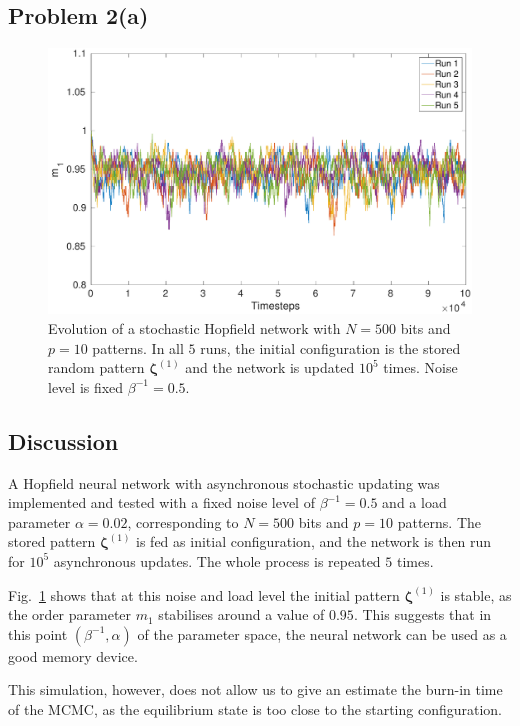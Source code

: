 \documentclass[12pt,A4,titlepage]{article}
\begin{document}
\subsection*{Problem 2(a)}

\begin{figure}[H]
\centering
\includegraphics[width=\textwidth]{figures/fig_2a.pdf}
\caption{Evolution of a stochastic Hopfield network with $N = 500$ bits and $p = 10$ patterns. In all $5$ runs, the initial configuration is the  stored random pattern $\bm{\zeta}^{(1)}$ and the network is updated $10^5$ times. Noise level is fixed $\beta^{-1} = 0.5$.}
\label{2a}
\end{figure}

\subsection*{Discussion}
A Hopfield neural network with asynchronous stochastic updating was implemented and tested with a fixed noise level of $\beta^{-1} = 0.5$ and a load parameter $\alpha = 0.02$, corresponding to $N = 500$ bits and $p = 10$ patterns. 
The stored pattern $\bm{\zeta}^{(1)}$ is fed as initial configuration, and the network is then run for $10^5$ asynchronous updates. The whole process is repeated $5$ times. 

Fig.~\ref{2a} shows that at this noise and load level the initial pattern $\bm{\zeta}^{(1)}$ is stable, as the order parameter $m_1$ stabilises around a value of $0.95$. This suggests that in this point $(\beta^{-1}, \alpha)$ of the parameter space, the neural network can be used as a good memory device.

This simulation, however, does not allow us to give an estimate the burn-in time of the MCMC, as the equilibrium state is too close to the starting configuration.
\end{document}
